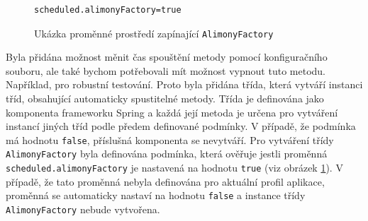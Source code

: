             \begin{figure}
                \begin{verbatim}
scheduled.alimonyFactory=true
                \end{verbatim}
                \caption{Ukázka proměnné prostředí zapínající \texttt{AlimonyFactory}} 
                \label{code:alimony-factory-true}
            \end{figure}
            Byla přidána možnost měnit čas spouštění metody pomocí konfiguračního souboru, ale také bychom potřebovali mít možnost vypnout tuto metodu. Například, pro robustní testování. Proto byla přidána třída, která vytváří instanci tříd, obsahující automaticky spustitelné metody. Třída je definována jako komponenta frameworku Spring a každá její metoda je určena pro vytváření instancí jiných tříd podle předem definované podmínky.
            V případě, že podmínka má hodnotu \verb|false|, příslušná komponenta se nevytváří.
            Pro vytváření třídy \verb|AlimonyFactory| byla definována podmínka, která ověřuje jestli proměnná \verb|scheduled.alimonyFactory| je nastavená na hodnotu \verb|true| (viz obrázek \ref{code:alimony-factory-true}). V případě, že tato proměnná nebyla definována pro aktuální profil aplikace, proměnná se automaticky nastaví na hodnotu \verb|false| a instance třídy \verb|AlimonyFactory| nebude vytvořena.
        
